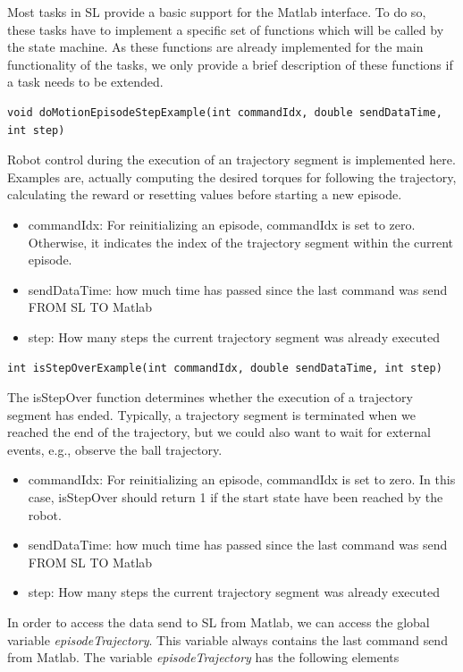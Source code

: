 \documentclass[11pt, article, colorback]{article}
\begin{document}
Most tasks in SL provide a basic support for the Matlab interface. To do so, these tasks have to implement 
a specific set of functions which will be called by the state machine. As these functions are already implemented 
for the main functionality of the tasks, we only provide a brief description of these functions if a task needs to be extended. 



\begin{lstlisting}
void doMotionEpisodeStepExample(int commandIdx, double sendDataTime, int step)
\end{lstlisting}
Robot control during the execution of an trajectory segment is implemented here. 
Examples are, actually computing the desired 
torques for following the trajectory, 
calculating the reward or resetting values before starting a new episode.
\begin{itemize}
\item commandIdx: For reinitializing an episode, commandIdx is set to zero. Otherwise, it indicates the index of the trajectory
segment within the current episode. 
\item sendDataTime: how much time has passed since the last command was send FROM SL TO Matlab
\item step: How many steps the current trajectory segment was already executed
\end{itemize}

\begin{lstlisting}
int isStepOverExample(int commandIdx, double sendDataTime, int step)
\end{lstlisting}

The isStepOver function determines whether the execution of a trajectory segment has ended. 
Typically, a trajectory segment is terminated when we reached the end of the trajectory, but we could also want to wait for external events, e.g., observe the ball trajectory. 
\begin{itemize}
\item commandIdx: For reinitializing an episode, commandIdx is set to zero. In this case, isStepOver should return 1 if the start state have been reached by the robot. 
\item sendDataTime: how much time has passed since the last command was send FROM SL TO Matlab
\item step: How many steps the current trajectory segment was already executed
\end{itemize}

In order to access the data send to SL from Matlab, we can access the global variable {\em episodeTrajectory}. This variable always
contains the last command send from Matlab. The variable {\em episodeTrajectory} has the following elements
\end{document}
